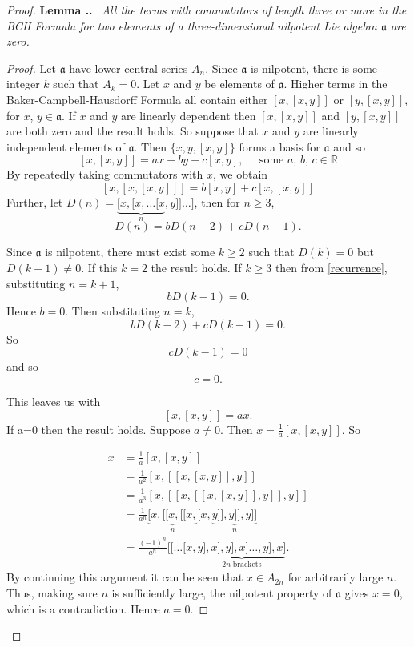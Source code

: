 \documentclass[honours]{UNSWthesis}
\newcommand{\R}{\mathbb{R}}
\newcommand{\1}{\mathbf{e}_{1}}
\newcommand{\2}{\mathbf{e}_{3}}
\newcommand{\3}{\mathbf{e}_{3}}
\newcounter{Item}[section]
\newenvironment{Lemma}{\medskip
                            \refstepcounter{Item}
                            \noindent
                           {\bf Lemma \thesection.\theItem.}\ %
                            \begingroup \sl}
                           {\endgroup\medskip}
\begin{document}
\begin{proof}
\begin{Lemma}
All the terms with commutators of length three or more in the BCH Formula for two elements of a three-dimensional nilpotent Lie algebra $\mathfrak{a}$ are zero.

\begin{proof} 
Let $\mathfrak{a}$ have lower central series $A_{n}$. Since $\mathfrak{a}$ is nilpotent, there is some integer $k$ such that $A_{k}=0$.\newline
Let $x$ and $y$ be elements of $\mathfrak{a}$.
Higher terms in the Baker-Campbell-Hausdorff Formula all contain either $[x,[x,y]]$ or $[y,[x,y]]$, for $x$, $y \in \mathfrak{a}$. If $x$ and $y$ are linearly dependent then $[x,[x,y]]$ and $[y,[x,y]]$ are both zero and the result holds. So suppose that $x$ and $y$ are linearly independent elements of $\mathfrak{a}$. Then $\{x,y,[x,y]\}$ forms a basis for $\mathfrak{a}$ and so
\[
[x,[x,y]]=ax+by+c[x,y], \;\;\;\;\; \text{some $a$, $b$, $c \in \R$}
\]
By repeatedly taking commutators with $x$, we obtain
\[
[x,[x,[x,y]]]=b[x,y]+c[x,[x,y]]
\]
Further, let $D(n)=\underbrace{[x,[x,\ldots[x}_{n},y]] \ldots ]$, then for $n \geq 3$,
\begin{equation}\label{recurrence}
D(n)=bD(n-2)+cD(n-1).
\end{equation}

Since $\mathfrak{a}$ is nilpotent, there must exist some $k \geq 2$ such that $D(k)=0$ but $D(k-1) \neq 0$. If this $k=2$ the result holds. If $k \geq 3$ then from \ref{recurrence}, substituting $n=k+1$,
\[
bD(k-1)=0
.\] Hence $b=0$.
Then substituting $n=k$,
\[
bD(k-2)+cD(k-1)=0
.\] So
\[
cD(k-1)=0
\] and so
\[
c=0.
\]

This leaves us with 
\[
[x,[x,y]]=ax.
\]
If a=0 then the result holds. Suppose $a \neq 0$. Then $x=\frac{1}{a}[x,[x,y]]$. So

\begin{align*}
x &= \frac{1}{a}[x,[x,y]] \\
&= \frac{1}{a^{2}}[x,[[x,[x,y]],y]] \\
&=\frac{1}{a^{3}}[x,[[x,[[x,[x,y]],y]],y]] \\
&=\frac{1}{a^{n}}\underbrace{[x,[[x,[[x,}_{n}[x,\underbrace{y]],y]],y]]}_{n}\\
&=\frac{(-1)^{n}}{a^{n}}[[\ldots[x,\underbrace{y],x],y],x]\ldots,y],x]}_{2n\; \text{brackets}} .
\end{align*}
By continuing this argument it can be seen that $x \in A_{2n}$ for arbitrarily large $n$. Thus, making sure $n$ is sufficiently large, the nilpotent property of $\mathfrak{a}$ gives $x=0$, which is a contradiction. Hence $a=0$.


\end{proof}
\end{Lemma}
\end{proof}
\end{document}
